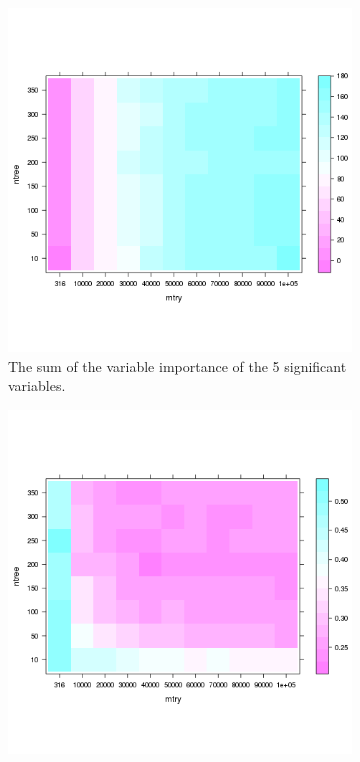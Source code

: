 \documentclass[10pt,letterpaper]{article}
\begin{document}
\begin{figure}[tbhp] 
 \begin{adjustwidth}{-1.00in}{0in}
  \begin{subfigure}[b]{0.5\linewidth}
    \centering
    \includegraphics[totalheight=8cm]{./figs/variable_importance.png} 
    \caption{The sum of the variable importance of the 5 significant variables.} 
    \label{fig7:a} 
    \vspace{4ex}
  \end{subfigure}%
  \begin{subfigure}[b]{0.5\linewidth}
    \centering
    \includegraphics[totalheight=8cm]{./figs/out-of-bag-prediction-error.png}

\end{subfigure}
\end{adjustwidth}
\end{figure}
\end{document}
